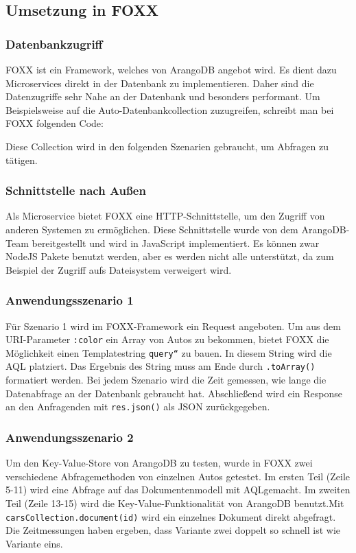 \subsection{Umsetzung in FOXX}
\subsubsection{Datenbankzugriff}
FOXX ist ein Framework, welches von ArangoDB angebot wird. Es dient dazu Microservices direkt in der Datenbank zu implementieren. Daher sind die Datenzugriffe sehr Nahe an der Datenbank und besonders performant. Um Beispielsweise auf die Auto-Datenbankcollection zuzugreifen, schreibt man bei FOXX folgenden Code:

Diese Collection wird in den folgenden Szenarien gebraucht, um Abfragen zu tätigen.
\subsubsection{Schnittstelle nach Außen}
Als Microservice bietet FOXX eine HTTP-Schnittstelle, um den Zugriff von anderen Systemen zu ermöglichen. Diese Schnittstelle wurde von dem ArangoDB-Team bereitgestellt und wird in JavaScript implementiert. Es können zwar NodeJS Pakete benutzt werden, aber es werden nicht alle unterstützt, da zum Beispiel der Zugriff aufs Dateisystem verweigert wird.
\subsubsection{Anwendungsszenario 1}
Für Szenario 1 wird im FOXX-Framework ein Request angeboten. Um aus dem URI-Parameter \texttt{:color} ein Array von Autos zu bekommen, bietet FOXX die Möglichkeit einen Templatestring \texttt{query``} zu bauen. In diesem String wird die \ac{AQL} platziert. Das Ergebnis des String muss am Ende durch \texttt{.toArray()} formatiert werden. Bei jedem Szenario wird die Zeit gemessen, wie lange die Datenabfrage an der Datenbank gebraucht hat. Abschließend wird ein Response an den Anfragenden mit \texttt{res.json()} als \ac{JSON} zurückgegeben.

\subsubsection{Anwendungsszenario 2}
Um den Key-Value-Store von ArangoDB zu testen, wurde in FOXX zwei verschiedene Abfragemethoden von einzelnen Autos getestet. Im ersten Teil (Zeile 5-11) wird eine Abfrage auf das Dokumentenmodell mit \ac{AQL}gemacht. Im zweiten Teil (Zeile 13-15) wird die Key-Value-Funktionalität von ArangoDB benutzt.\newline Mit \texttt{carsCollection.document(id)} wird ein einzelnes Dokument direkt abgefragt. Die Zeitmessungen haben ergeben, dass Variante zwei doppelt so schnell ist wie Variante eins.

